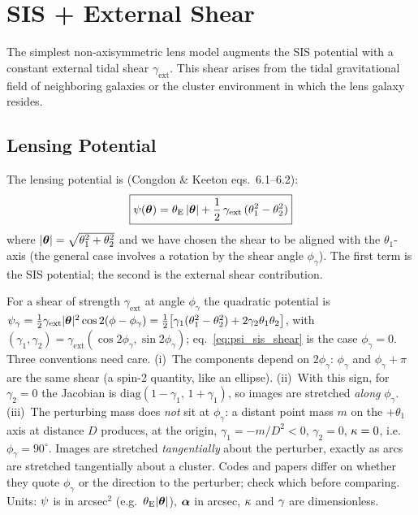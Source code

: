 \section{SIS + External Shear}
\label{sec:sis_shear}

The simplest non-axisymmetric lens model augments the SIS potential
with a constant external tidal shear $\gamma_{\mathrm{ext}}$.
This shear arises from the tidal gravitational field of
neighboring galaxies or the cluster environment in which the lens
galaxy resides.

\subsection{Lensing Potential}

The lensing potential is
(Congdon \& Keeton eqs.~6.1--6.2):
\begin{equation}
    \boxed{
    \psi(\boldsymbol{\theta}) = \theta_{\mathrm{E}}\,|\boldsymbol{\theta}|
    + \frac{1}{2}\,\gamma_{\mathrm{ext}}\,
    (\theta_1^2 - \theta_2^2)
    }
    \label{eq:psi_sis_shear}
\end{equation}
where $|\boldsymbol{\theta}| = \sqrt{\theta_1^2 + \theta_2^2}$ and we have
chosen the shear to be aligned with the $\theta_1$-axis (the general
case involves a rotation by the shear angle $\phi_\gamma$).  The
first term is the SIS potential; the second is the external shear
contribution.

\begin{annotation}
For a shear of strength $\gamma_{\mathrm{ext}}$ at angle $\phi_\gamma$ the
quadratic potential is
$\psi_\gamma = \tfrac12\gamma_{\mathrm{ext}}|\boldsymbol{\theta}|^2\cos 2(\phi-\phi_\gamma)
= \tfrac12\big[\gamma_1(\theta_1^2-\theta_2^2) + 2\gamma_2\theta_1\theta_2\big]$,
with $(\gamma_1,\gamma_2) = \gamma_{\mathrm{ext}}(\cos 2\phi_\gamma,\sin 2\phi_\gamma)$;
eq.~\eqref{eq:psi_sis_shear} is the case $\phi_\gamma = 0$.  Three
conventions need care.
(i)~The components depend on $2\phi_\gamma$: $\phi_\gamma$ and
$\phi_\gamma+\pi$ are the same shear (a spin-2 quantity, like an ellipse).
(ii)~With this sign, for $\gamma_2 = 0$ the Jacobian is
$\mathrm{diag}(1-\gamma_1,\,1+\gamma_1)$, so images are stretched
\emph{along} $\phi_\gamma$.
(iii)~The perturbing mass does \emph{not} sit at $\phi_\gamma$: a distant point
mass $m$ on the $+\theta_1$ axis at distance $D$ produces, at the origin,
$\gamma_1 = -m/D^2 < 0$, $\gamma_2 = 0$, $\kappa = 0$, i.e.\
$\phi_\gamma = 90^\circ$.  Images are stretched \emph{tangentially} about the
perturber, exactly as arcs are stretched tangentially about a cluster.  Codes
and papers differ on whether they quote $\phi_\gamma$ or the direction to the
perturber; check which before comparing.
Units: $\psi$ is in arcsec$^2$ (e.g.\ $\theta_{\mathrm{E}}|\boldsymbol{\theta}|$), $\boldsymbol{\alpha}$ in
arcsec, $\kappa$ and $\gamma$ are dimensionless.
\end{annotation}


